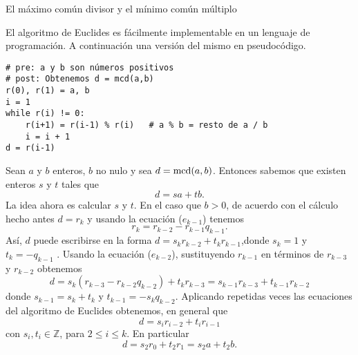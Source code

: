 \begin{section}{El máximo común divisor y el mínimo común
múltiplo}
\begin{observacion}[*] El algoritmo de Euclides es fácilmente implementable en un lenguaje de programación. A continuación una versión del mismo en pseudocódigo. 

\begin{minipage}{200pt}
\begin{small}
\begin{verbatim}
# pre: a y b son números positivos
# post: Obtenemos d = mcd(a,b)
r(0), r(1) = a, b
i = 1 
while r(i) != 0:
    r(i+1) = r(i-1) % r(i)   # a % b = resto de a / b
    i = i + 1
d = r(i-1)
\end{verbatim}
\end{small}
\end{minipage}


\end{observacion}



Sean $a$ y $b$ enteros, $b$ no nulo y sea $d=\operatorname{mcd}(a,b)$. Entonces sabemos que existen enteros $s$ y $t$ tales que
$$
d=sa+tb.
$$
La idea ahora es calcular $s$ y $t$. En el caso que $b >0$, de acuerdo con el cálculo hecho antes $d=r_{k}$ y usando la  ecuación ($e_{k-1}$) tenemos
$$
r_{k}=r_{k-2} -r_{k-1}q_{k-1}.
$$
As{í}, $d$ puede escribirse en la forma $ d = s_{k}r_{k-2} +t_{k}r_{k-1}$,donde $s_{k}=1$ y $t_{k}=-q_{k-1}$ . Usando la ecuación  ($e_{k-2}$), sustituyendo $r_{k-1}$ en términos de $r_{k-3}$ y $r_{k-2}$ obtenemos
$$
d= s_{k}(r_{k-3}-r_{k-2}q_{k-2}) + t_{k}r_{k-3} =  s_{k-1}r_{k-3} +t_{k-1}r_{k-2}
$$
donde $s_{k-1} = s_{k} + t_{k} $ y $t_{k-1}= -s_{k}q_{k-2}$.  Aplicando  repetidas veces las ecuaciones del algoritmo de Euclides obtenemos, en general que 
$$
d =  s_{i}r_{i-2} +t_{i}r_{i-1}
$$
con  $s_{i}, t_{i} \in \mathbb Z$, para $2 \le i \le k$. En particular 
$$
d =  s_{2}r_{0} +t_{2}r_{1} = s_{2}a +t_{2}b.
$$


\end{section}
